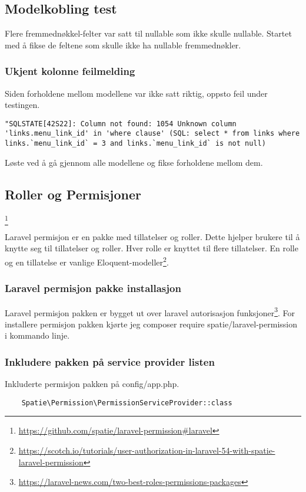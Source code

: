 \subsection{Modelkobling test}
Flere fremmednøkkel-felter var satt til nullable som ikke skulle nullable. Startet med å fikse de feltene som skulle ikke ha nullable fremmednøkler.

\subsubsection{Ukjent kolonne feilmelding}
Siden forholdene mellom modellene var ikke satt riktig, oppsto feil under testingen.
\begin{lstlisting}
"SQLSTATE[42S22]: Column not found: 1054 Unknown column 'links.menu_link_id' in 'where clause' (SQL: select * from links where links.`menu_link_id` = 3 and links.`menu_link_id` is not null) 
\end{lstlisting}
Løste ved å gå gjennom alle modellene og fikse forholdene mellom dem.

\subsection {Roller og Permisjoner} \footnote{\url{https://github.com/spatie/laravel-permission#laravel}}

Laravel permisjon er en pakke med tillatelser og roller. Dette hjelper brukere til å knytte seg til tillatelser og roller. Hver rolle er knyttet til flere tillatelser. En rolle og en tillatelse er vanlige Eloquent-modeller\footnote{\url{https://scotch.io/tutorials/user-authorization-in-laravel-54-with-spatie-laravel-permission}}.
\subsubsection{Laravel permisjon pakke installasjon} 
Laravel permisjon pakken er bygget ut over laravel autorisasjon funksjoner\footnote{\url{https://laravel-news.com/two-best-roles-permissions-packages}}.
For installere permisjon pakken kjørte jeg composer require spatie/laravel-permission i kommando linje.

\subsubsection{Inkludere pakken på service provider listen}
Inkluderte permisjon pakken på config/app.php. 
\begin{lstlisting}
    Spatie\Permission\PermissionServiceProvider::class
\end{lstlisting}

